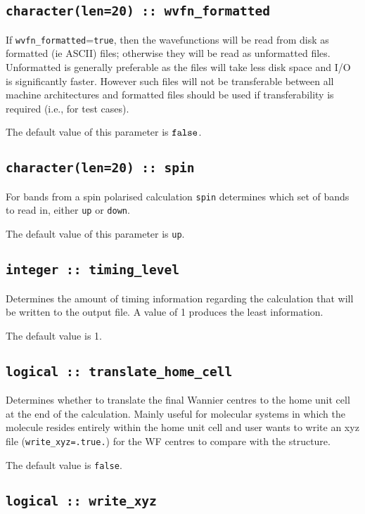 \subsection[wvfn\_formated]{\tt character(len=20) :: wvfn\_formatted}

If \verb#wvfn_formatted#=\verb#true#, then the wavefunctions will be
read from disk as formatted (ie ASCII) files; otherwise they will be
read as unformatted files. Unformatted is generally preferable as the
files will take less disk space and I/O is significantly
faster. However such files will not be transferable between all
machine architectures and formatted files should be used if
transferability is required (i.e., for test cases).

The default value of this parameter is $\verb#false#$.


\subsection[spin]{\tt character(len=20) :: spin}
For bands from a spin polarised calculation {\tt spin} determines which set
of bands to read in, either \verb#up# or \verb#down#.

The default value of this parameter is \verb#up#.


\subsection[timing\_level]{\tt integer :: timing\_level}

Determines the amount of timing information regarding the calculation
that will be written to the output file. A value of 1 produces the
least information.

The default value is 1.

\subsection[translate\_home\_cell]{\tt logical :: translate\_home\_cell}

Determines whether to translate the final Wannier centres to the home
unit cell at the end of the calculation. Mainly useful for molecular
systems in which the molecule resides entirely within the home unit
cell and user wants to write an xyz file ({\tt write\_xyz=.true.}) for
the WF centres to compare with the structure.

The default value is \verb#false#.

\subsection[write\_xyz]{\tt logical :: write\_xyz}

